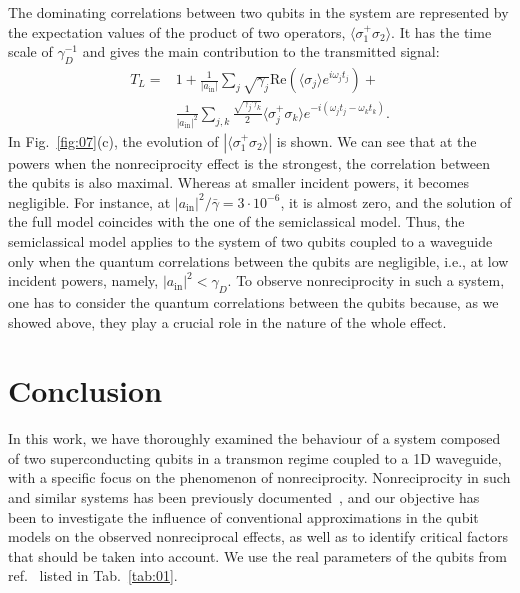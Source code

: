 \documentclass[lettersize,journal]{IEEEtran}
\begin{document}
The dominating correlations between two qubits in the system are represented by the expectation values of the product of two operators, $\langle \sigma_1^+ \sigma_2 \rangle$.
It has the time scale of $\gamma_D^{-1}$ and gives the main contribution to the transmitted signal:
\begin{equation} \label{eq:25}
\begin{aligned}
    T_L =& 1 + \frac{1}{|a_\mathrm{in}|}\sum_j \sqrt{\gamma_j} \mathrm{Re}\left(\langle \sigma_j \rangle e^{i \omega_j t_j}\right) + \\
    &\frac{1}{|a_\mathrm{in}|^2} \sum_{j,k} \frac{\sqrt{\gamma_j \gamma_k}}{2} \langle \sigma_j^+ \sigma_k \rangle e^{-i (\omega_j t_j - \omega_k t_k)}.
\end{aligned}
\end{equation}
In Fig.~\ref{fig:07}(c), the evolution of $|\langle \sigma_1^+ \sigma_2\rangle |$ is shown.
We can see that at the powers when the nonreciprocity effect is the strongest, the correlation between the qubits is also maximal.
Whereas at smaller incident powers, it becomes negligible.
For instance, at $|a_\mathrm{in}|^2 / \bar{\gamma} = 3\cdot 10^{-6}$, it is almost zero, and the solution of the full model coincides with the one of the semiclassical model.
Thus, the semiclassical model applies to the system of two qubits coupled to a waveguide only when the quantum correlations between the qubits are negligible, i.e., at low incident powers, namely, $|a_\mathrm{in}|^2 < \gamma_D$.
To observe nonreciprocity in such a system, one has to consider the quantum correlations between the qubits because, as we showed above, they play a crucial role in the nature of the whole effect.

\section{Conclusion}

In this work, we have thoroughly examined the behaviour of a system composed of two superconducting qubits in a transmon regime coupled to a 1D waveguide, with a specific focus on the phenomenon of nonreciprocity. 
Nonreciprocity in such and similar systems has been previously documented~\cite{dai_rectification_2015, muller_nonreciprocal_2017, rosario_hamann_nonreciprocity_2018, Nefedkin2022, trivedi_fano-qubits_2023}, and our objective has been to investigate the influence of conventional approximations in the qubit models on the observed nonreciprocal effects, as well as to identify critical factors that should be taken into account.
We use the real parameters of the qubits from ref.~\cite{rosario_hamann_nonreciprocity_2018} listed in Tab.~\ref{tab:01}.
\end{document}
